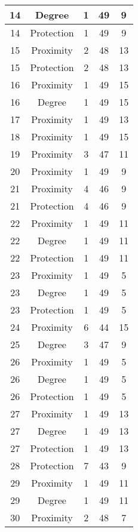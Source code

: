 \documentclass[results.tex]{subfiles}
\begin{document}
\begin{center}
\begin{tabular}{| c || c | c | c | c |}
    \hline
    14 & Degree & 1 & 49 & 9 \\ 
    \hline
    14 & Protection & 1 & 49 & 9 \\ 
    \hline
    15 & Proximity & 2 & 48 & 13 \\ 
    \hline
    15 & Protection & 2 & 48 & 13 \\ 
    \hline
    16 & Proximity & 1 & 49 & 15 \\ 
    \hline
    16 & Degree & 1 & 49 & 15 \\ 
    \hline
    17 & Proximity & 1 & 49 & 13 \\ 
    \hline
    18 & Proximity & 1 & 49 & 15 \\ 
    \hline
    19 & Proximity & 3 & 47 & 11 \\ 
    \hline
    20 & Proximity & 1 & 49 & 9 \\ 
    \hline
    21 & Proximity & 4 & 46 & 9 \\ 
    \hline
    21 & Protection & 4 & 46 & 9 \\ 
    \hline
    22 & Proximity & 1 & 49 & 11 \\ 
    \hline
    22 & Degree & 1 & 49 & 11 \\ 
    \hline
    22 & Protection & 1 & 49 & 11 \\ 
    \hline
    23 & Proximity & 1 & 49 & 5 \\ 
    \hline
    23 & Degree & 1 & 49 & 5 \\ 
    \hline
    23 & Protection & 1 & 49 & 5 \\ 
    \hline
    24 & Proximity & 6 & 44 & 15 \\ 
    \hline
    25 & Degree & 3 & 47 & 9 \\ 
    \hline
    26 & Proximity & 1 & 49 & 5 \\ 
    \hline
    26 & Degree & 1 & 49 & 5 \\ 
    \hline
    26 & Protection & 1 & 49 & 5 \\ 
    \hline
    27 & Proximity & 1 & 49 & 13 \\ 
    \hline
    27 & Degree & 1 & 49 & 13 \\ 
    \hline
    27 & Protection & 1 & 49 & 13 \\ 
    \hline
    28 & Protection & 7 & 43 & 9 \\ 
    \hline
    29 & Proximity & 1 & 49 & 11 \\ 
    \hline
    29 & Degree & 1 & 49 & 11 \\ 
    \hline
    30 & Proximity & 2 & 48 & 7 \\ 

\end{tabular}
\end{center}
\end{document}
